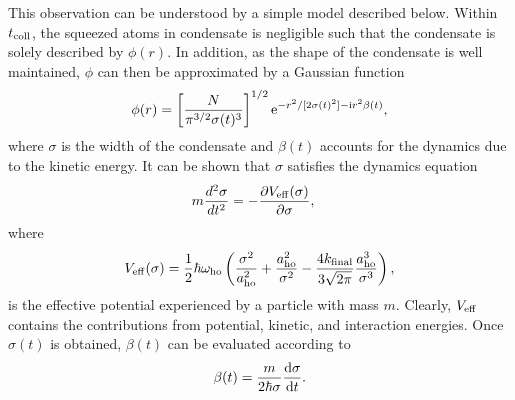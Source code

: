 \documentclass[pra,twocolumn,preprintnumbers,superscriptaddress,longbibliography,showkeys]{revtex4-1}
\begin{document}
This observation can be understood by a simple model described below. Within $t_{\rm coll}$, the squeezed atoms in condensate is negligible such that the condensate is solely described by $\phi(r)$. In addition, as the shape of the condensate is well maintained, $\phi$ can then be approximated by a Gaussian function
\begin{align}
\phi(r)=\left[\frac{N}{\pi^{3/2} \sigma(t)^{3}}\right]^{1/2} {\rm e}^{-r^2/[2\sigma(t)^2]-{\rm i}r^2\beta(t)},\label{gauans}
\end{align}
where $\sigma$ is the width of the condensate and $\beta(t)$ accounts for the dynamics due to the kinetic energy. It can be shown that $\sigma$ satisfies the dynamics equation
\begin{align}
m\frac{d^2\sigma}{dt^2}&=-\frac{\partial V_{\rm eff}(\sigma)}{\partial \sigma},\label{effdyn}
\end{align}
where
\begin{align}
V_{\rm eff}(\sigma)=\frac{1}{2}\hbar\omega_{\rm ho}\left(\frac{\sigma^2}{a_{\rm ho}^2} + \frac{a_{\rm ho}^2}{\sigma^2} - \frac{4k_{\rm final}}{3\sqrt{2\pi}} \frac{a_{\rm ho}^3}{\sigma^3}\right), \label{veff}
\end{align}
is the effective potential experienced by a particle with mass $m$. Clearly, $V_{\rm eff}$ contains the contributions from potential, kinetic, and interaction energies. Once $\sigma(t)$ is obtained, $\beta(t)$ can be evaluated according to
\begin{align}
\beta(t) = \frac{m}{2\hbar\sigma}\frac{{\rm d}\sigma}{{\rm d}t}.\label{effdyn2}
\end{align}
\end{document}
